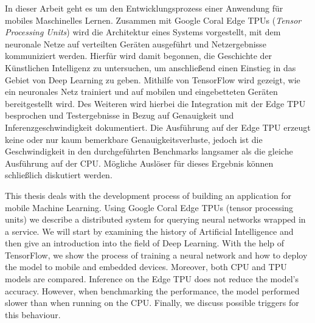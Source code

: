 \newenvironment{abstractpage}
{\cleardoublepage\vspace*{\fill}\thispagestyle{empty}}
{\vfill\cleardoublepage}
\newenvironment{myabstract}[1]
{\bigskip\selectlanguage{#1}
  \begin{center}
    \bfseries\abstractname
  \end{center}}
{\par\bigskip}

\begin{abstractpage}
\begin{myabstract}{german}
In dieser Arbeit geht es um den Entwicklungsprozess einer Anwendung
für mobiles Maschinelles Lernen. Zusammen mit Google Coral Edge TPUs
(\textit{Tensor Processing Units})
wird die Architektur eines Systems vorgestellt, mit dem
neuronale Netze auf verteilten Geräten ausgeführt
und Netzergebnisse kommuniziert werden.
Hierfür wird damit begonnen, die Geschichte der Künstlichen Intelligenz
zu untersuchen, um anschließend einen Einstieg in das Gebiet
von Deep Learning zu geben. Mithilfe von TensorFlow wird
gezeigt, wie ein neuronales Netz trainiert
und auf mobilen und eingebetteten Geräten bereitgestellt wird.
Des Weiteren wird hierbei die Integration mit der Edge TPU besprochen
und Testergebnisse in Bezug auf Genauigkeit und Inferenzgeschwindigkeit
dokumentiert. Die Ausführung auf der Edge TPU erzeugt keine
oder nur kaum bemerkbare Genauigkeitsverluste, jedoch ist die Geschwindigkeit
in den durchgeführten Benchmarks
langsamer als die gleiche Ausführung auf der CPU.
Mögliche Auslöser für dieses Ergebnis können schließlich diskutiert werden.
\end{myabstract}
\begin{myabstract}{english}
This thesis deals with the development process of building
an application for mobile Machine Learning.
Using Google Coral Edge TPUs (tensor processing units)
we describe a distributed system
for querying neural networks wrapped in a service.
We will start by examining the history of Artificial Intelligence
and then give an introduction into the field of Deep Learning.
With the help of TensorFlow, we show the process of training a
neural network and how to deploy the model to
mobile and embedded devices. Moreover, both CPU and TPU models are compared.
Inference on the Edge TPU does not reduce the model's accuracy.
However, when benchmarking the performance,
the model performed slower than when running on the CPU.
Finally, we discuss possible triggers for this behaviour.
\end{myabstract}
\end{abstractpage}